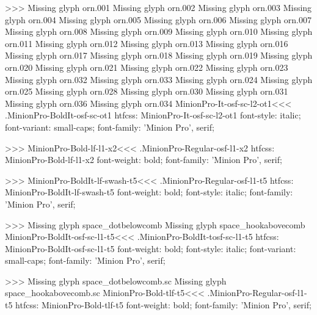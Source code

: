 {>>>
Missing glyph	orn.001
Missing glyph	orn.002
Missing glyph	orn.003
Missing glyph	orn.004
Missing glyph	orn.005
Missing glyph	orn.006
Missing glyph	orn.007
Missing glyph	orn.008
Missing glyph	orn.009
Missing glyph	orn.010
Missing glyph	orn.011
Missing glyph	orn.012
Missing glyph	orn.013
Missing glyph	orn.016
Missing glyph	orn.017
Missing glyph	orn.018
Missing glyph	orn.019
Missing glyph	orn.020
Missing glyph	orn.021
Missing glyph	orn.022
Missing glyph	orn.023
Missing glyph	orn.032
Missing glyph	orn.033
Missing glyph	orn.024
Missing glyph	orn.025
Missing glyph	orn.028
Missing glyph	orn.030
Missing glyph	orn.031
Missing glyph	orn.036
Missing glyph	orn.034
\<MinionPro-It-osf-sc-l2-ot1\><<<
.MinionPro-BoldIt-osf-sc-ot1
htfcss:  MinionPro-It-osf-sc-l2-ot1  font-style: italic; font-variant: small-caps; font-family: 'Minion Pro', serif;

>>>
\<MinionPro-Bold-lf-l1-x2\><<<
.MinionPro-Regular-osf-l1-x2
htfcss:  MinionPro-Bold-lf-l1-x2  font-weight: bold; font-family: 'Minion Pro', serif;

>>>
\<MinionPro-BoldIt-lf-swash-t5\><<<
.MinionPro-Regular-osf-l1-t5
htfcss:  MinionPro-BoldIt-lf-swash-t5  font-weight: bold; font-style: italic; font-family: 'Minion Pro', serif;

>>>
Missing glyph	space_dotbelowcomb
Missing glyph	space_hookabovecomb
\<MinionPro-BoldIt-osf-sc-l1-t5\><<<
.MinionPro-BoldIt-tosf-sc-l1-t5
htfcss:  MinionPro-BoldIt-osf-sc-l1-t5  font-weight: bold; font-style: italic; font-variant: small-caps; font-family: 'Minion Pro', serif;

>>>
Missing glyph	space_dotbelowcomb.sc
Missing glyph	space_hookabovecomb.sc
\<MinionPro-Bold-tlf-t5\><<<
.MinionPro-Regular-osf-l1-t5
htfcss:  MinionPro-Bold-tlf-t5  font-weight: bold; font-family: 'Minion Pro', serif;

}
